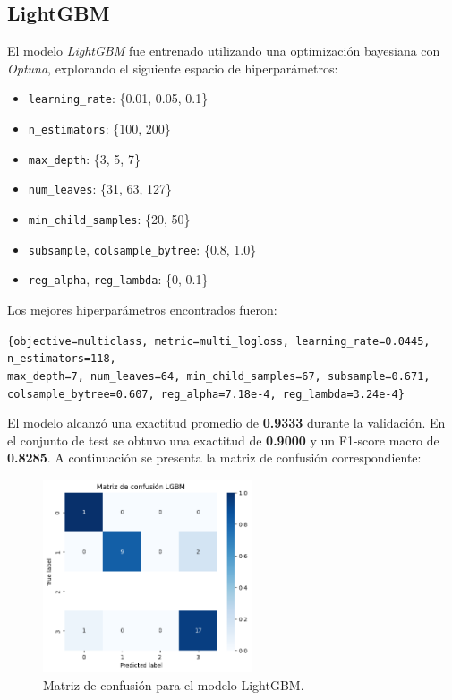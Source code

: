 \documentclass[11pt]{report}
\begin{document}
\subsection{LightGBM}

El modelo \textit{LightGBM} fue entrenado utilizando una optimización bayesiana con \textit{Optuna}, explorando el siguiente espacio de hiperparámetros:

\begin{itemize}[noitemsep]
  \item \texttt{learning\_rate}: \{0.01, 0.05, 0.1\}
  \item \texttt{n\_estimators}: \{100, 200\}
  \item \texttt{max\_depth}: \{3, 5, 7\}
  \item \texttt{num\_leaves}: \{31, 63, 127\}
  \item \texttt{min\_child\_samples}: \{20, 50\}
  \item \texttt{subsample}, \texttt{colsample\_bytree}: \{0.8, 1.0\}
  \item \texttt{reg\_alpha}, \texttt{reg\_lambda}: \{0, 0.1\}
\end{itemize}

Los mejores hiperparámetros encontrados fueron:
\begin{center}
\texttt{\{objective=multiclass, metric=multi\_logloss, learning\_rate=0.0445, n\_estimators=118,} \\
\texttt{max\_depth=7, num\_leaves=64, min\_child\_samples=67, subsample=0.671,} \\
\texttt{colsample\_bytree=0.607, reg\_alpha=7.18e-4, reg\_lambda=3.24e-4\}}
\end{center}

El modelo alcanzó una exactitud promedio de \textbf{0.9333} durante la validación. En el conjunto de test se obtuvo una exactitud de \textbf{0.9000} y un F1-score macro de \textbf{0.8285}.  
A continuación se presenta la matriz de confusión correspondiente:

\begin{figure}[H]
    \centering
    \includegraphics[width=0.55\textwidth]{Imagenes/Matriz_LGBM_Test.png}
    \caption{Matriz de confusión para el modelo LightGBM.}
    \label{fig:cm-lgbm}
\end{figure}
\end{document}
